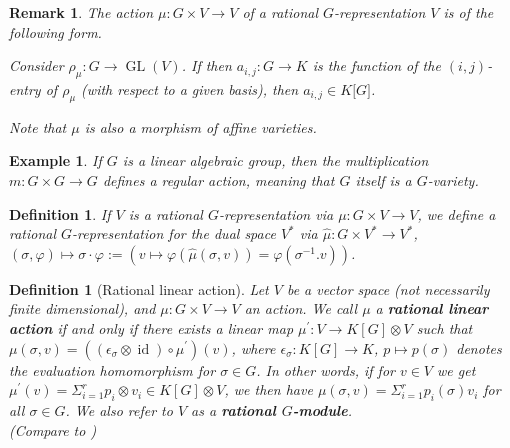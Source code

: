 \message{ !name(roughdraft.tex)}\documentclass[a4paper]{article}
\theoremstyle{prrt}
\newtheorem{definition}[theorem]{Definition}
\newtheorem{remark}{Remark}[theorem]
\newtheorem{dexample}{Example}[theorem]
\begin{document}
\begin{remark}
  The action $\mu \colon G \times V \rightarrow V$ of a rational $G$-representation $V$ is of the following form.
  
  Consider $\rho_{\mu} \colon G \rightarrow \operatorname{GL}(V)$.
  If then $ a_{i,j} : G \rightarrow K $ is the function of the \linebreak$\left( i,j \right) $-entry of $\rho_{\mu}$ (with respect to a given basis), then $ a_{i,j} \in K\lbrack G\rbrack $.
  
  Note that $\mu$ is also a morphism of affine varieties.
\end{remark}

\begin{dexample}
  If $G$ is a linear algebraic group, then the multiplication \linebreak$m \colon G \times G \rightarrow G$ defines a regular action, meaning that $G$ itself is a $G$-variety.
\end{dexample}

\begin{definition}
  If $V$ is a rational $G$-representation via $\mu \colon G \times V \rightarrow V$, we define a rational $G$-representation for the dual space $V^\ast$ via $\hat{\mu} \colon G \times V^\ast \rightarrow V^\ast$, $(\sigma,\varphi) \mapsto \sigma\cdot\varphi := (v \mapsto \varphi(\hat{\mu}(\sigma,v))= \varphi(\sigma^{-1}.v))$.
\end{definition}



\begin{definition}[Rational linear action]\label{rr}
  Let $V$ be a vector space (not necessarily finite dimensional), and $ \mu : G \times V \rightarrow V $ an action.
  We call $ \mu $ a \textbf{rational linear action} if and only if there exists a linear map $ \mu^\prime \colon V \rightarrow K[G] \otimes V $ such that $ \mu \left( \sigma , v \right) = \left( \left( \epsilon_\sigma \otimes \operatorname{id} \right) \circ \mu^\prime \right) \left(v\right) $, where $\epsilon_\sigma \colon K[G] \rightarrow K$, $p \mapsto p(\sigma)$ denotes the evaluation homomorphism for $\sigma \in G$.
  In other words, if for $v \in V$ we get $\mu^\prime(v) = \Sigma_{i=1}^rp_i \otimes v_i \in K[G]\otimes V$, we then have $\mu(\sigma,v) = \Sigma_{i=1}^r p_i(\sigma)v_i$ for all $\sigma \in G$.
  We also refer to $V$ as a \textbf{rational $G$-module}.  \\
  (Compare to \cite[A.1.7]{DK15})
\end{definition}
\end{document}
